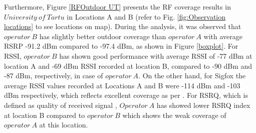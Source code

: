 \documentclass[12pt]{article}
\begin{document}
Furthermore, Figure \ref{RFOutdoor UT} presents the RF coverage results  in $University\ of\  Tartu$ in Locations A and B (refer to Fig. \ref{fig:Observation locations} to see locations on map). During the analysis, it was observed that $operator\ B$ has slightly better outdoor coverage than $operator\ A $ with average RSRP -91.2 dBm compared to -97.4 dBm, as shown in Figure \ref{boxplot}. For RSSI, $operator\ B$ has shown good performance with average RSSI of -77 dBm at location A and -69 dBm RSSI recorded at location B, compared to -90 dBm and -87 dBm, respectively, in case of $operator\ A$. On the other hand, for Sigfox the average RSSI values recorded at Locations A and B were -114 dBm and -103 dBm respectively, which reflects excellent coverage as per \cite{sigfoxRSSI}. For RSRQ, which is defined as quality of received signal \cite{3GPP}, $Operator\ A$ has showed lower RSRQ index at location B compared to $operator\ B$ which shows the weak coverage of $operator\ A$ at this location.\par



\end{document}
